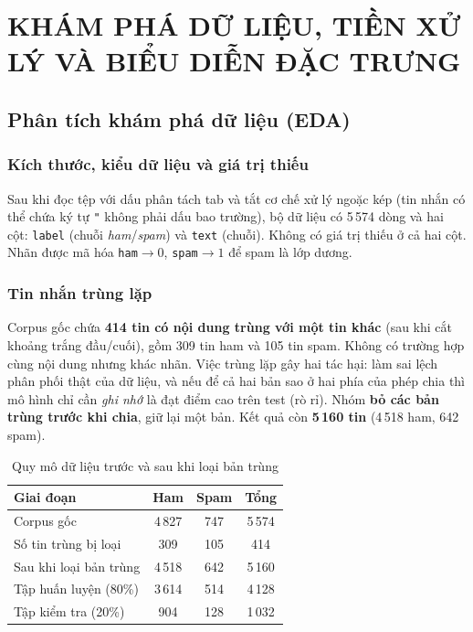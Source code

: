 \chapter{KHÁM PHÁ DỮ LIỆU, TIỀN XỬ LÝ VÀ BIỂU DIỄN ĐẶC TRƯNG}

\section{Phân tích khám phá dữ liệu (EDA)}

\subsection{Kích thước, kiểu dữ liệu và giá trị thiếu}

Sau khi đọc tệp với dấu phân tách tab và tắt cơ chế xử lý ngoặc kép (tin nhắn có thể chứa ký tự \texttt{"} không phải dấu bao trường), bộ dữ liệu có 5\,574 dòng và hai cột: \texttt{label} (chuỗi \textit{ham}/\textit{spam}) và \texttt{text} (chuỗi). Không có giá trị thiếu ở cả hai cột. Nhãn được mã hóa \texttt{ham}$\to0$, \texttt{spam}$\to1$ để spam là lớp dương.

\subsection{Tin nhắn trùng lặp}
\label{sec:eda-trung-lap}

Corpus gốc chứa \textbf{414 tin có nội dung trùng với một tin khác} (sau khi cắt khoảng trắng đầu/cuối), gồm 309 tin ham và 105 tin spam. Không có trường hợp cùng nội dung nhưng khác nhãn. Việc trùng lặp gây hai tác hại: làm sai lệch phân phối thật của dữ liệu, và nếu để cả hai bản sao ở hai phía của phép chia thì mô hình chỉ cần \textit{ghi nhớ} là đạt điểm cao trên test (rò rỉ). Nhóm \textbf{bỏ các bản trùng trước khi chia}, giữ lại một bản. Kết quả còn \textbf{5\,160 tin} (4\,518 ham, 642 spam).

\begin{table}[H]
\centering
\caption{Quy mô dữ liệu trước và sau khi loại bản trùng}
\label{tab:quy-mo}
\begin{tabular}{|p{5.4cm}|c|c|c|}
\hline
\textbf{Giai đoạn} & \textbf{Ham} & \textbf{Spam} & \textbf{Tổng} \\
\hline
Corpus gốc & 4\,827 & 747 & 5\,574 \\
\hline
Số tin trùng bị loại & 309 & 105 & 414 \\
\hline
Sau khi loại bản trùng & 4\,518 & 642 & 5\,160 \\
\hline
Tập huấn luyện (80\%) & 3\,614 & 514 & 4\,128 \\
\hline
Tập kiểm tra (20\%) & 904 & 128 & 1\,032 \\
\hline
\end{tabular}
\end{table}

